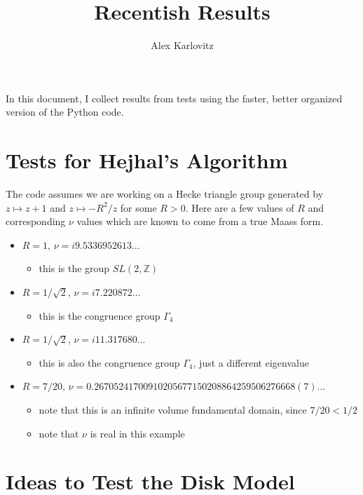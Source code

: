 \documentclass[]{article}
\title{Recentish Results}
\author{Alex Karlovitz}
\date{}
\begin{document}
	
	\maketitle
	
In this document, I collect results from tests using the faster, better organized version of the Python code.

\section*{Tests for Hejhal's Algorithm}

The code assumes we are working on a Hecke triangle group generated by $z \mapsto z + 1$ and $z \mapsto -R^2/z$ for some $R > 0$.
Here are a few values of $R$ and corresponding $\nu$ values which are known to come from a true Maass form.
\begin{itemize}
	\item $R = 1$, $\nu = i9.5336952613\dots$
	\begin{itemize}
		\item this is the group $SL(2, \mathbb{Z})$
	\end{itemize}
	\item $R = 1/\sqrt{2}$, $\nu = i7.220872\dots$
	\begin{itemize}
		\item this is the congruence group $\Gamma_4$
	\end{itemize}
	\item $R = 1/\sqrt{2}$, $\nu = i11.317680\dots$
	\begin{itemize}
		\item this is also the congruence group $\Gamma_4$, just a different eigenvalue
	\end{itemize}
	\item $R = 7/20$, $\nu = 0.26705241700910205677150208864259506276668(7)\dots$
	\begin{itemize}
		\item note that this is an infinite volume fundamental domain, since $7/20 < 1/2$
		\item note that $\nu$ is real in this example
	\end{itemize}
\end{itemize}

\section*{Ideas to Test the Disk Model}
\end{document}
